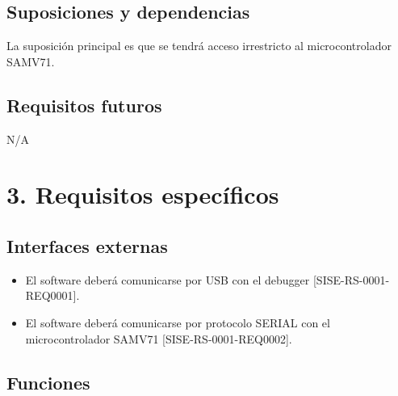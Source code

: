 \documentclass[
11pt, %
codirector, %
]{charter}
\begin{document}
\subsection{Suposiciones y dependencias}

La suposición principal es que se tendrá acceso irrestricto al microcontrolador SAMV71.

\subsection{Requisitos futuros}

N/A


\section{3. Requisitos específicos}
\label{sec:requisitos}


\subsection{Interfaces externas}

\begin{itemize}
	\item El software deberá comunicarse por USB con el debugger [SISE-RS-0001-REQ0001].
	\item El software deberá comunicarse por protocolo SERIAL con el microcontrolador SAMV71 [SISE-RS-0001-REQ0002].
\end{itemize}

\subsection{Funciones}
\end{document}
